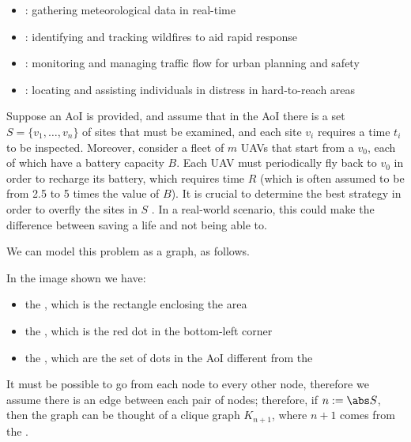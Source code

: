 \documentclass[a4paper, 12pt]{report}
\begin{document}
    \begin{itemize}
        \item {}: gathering meteorological data in real-time
        \item {}: identifying and tracking wildfires to aid rapid response
        \item {}: monitoring and managing traffic flow for urban planning and safety
        \item {}: locating and assisting individuals in distress in hard-to-reach areas
    \end{itemize}

    Suppose an AoI is provided, and assume that in the AoI there is a set $S = \{v_1, \ldots, v_n\}$ of sites that must be examined, and each site $v_i$ requires a time $t_i$ to be inspected. Moreover, consider a fleet of $m$ UAVs that start from a  $v_0$, each of which have a battery capacity $B$. Each UAV must periodically fly back to $v_0$ in order to recharge its battery, which requires time $R$ (which is often assumed to be from 2.5 to 5 times the value of $B$). It is crucial to determine the best strategy in order to overfly the sites in $S$ . In a real-world scenario, this could make the difference between saving a life and not being able to.

    We can model this problem as a graph, as follows.


    In the image shown we have:

    \begin{itemize}
        \item the , which is the rectangle enclosing the area
        \item the , which is the red dot in the bottom-left corner
        \item the , which are the set of dots in the AoI different from the 
    \end{itemize}

    It must be possible to go from each node to every other node, therefore we assume there is an edge between each pair of nodes; therefore, if $n := \abs S$, then the graph can be thought of a clique graph $K_{n + 1}$, where $n + 1$ comes from the .
\end{document}
